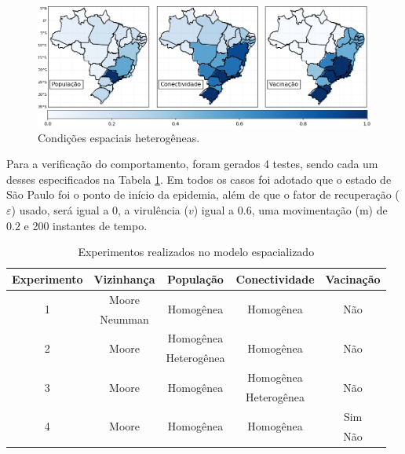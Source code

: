 \documentclass[a4paper,12pt]{article}
\begin{document}
\begin{figure}[!ht]
 \begin{center}
  \includegraphics[width=1\linewidth]{fig/variaveis_espaciais.png}
 \end{center}
 \caption{Condições espaciais heterogêneas.}
\label{figure:CI}
\end{figure}

Para a verificação do comportamento, foram gerados 4 testes, sendo cada um desses especificados na Tabela \ref{tab:exp}. Em todos os casos foi adotado que o estado de São Paulo foi o ponto de início da epidemia, além de que o fator de recuperação ($\varepsilon$) usado, será igual a 0, a virulência ($v$) igual a $0.6$, uma movimentação (m) de $0.2$ e 200 instantes de tempo.

\begin{table}[ht]
 \caption{Experimentos realizados no modelo espacializado}
 \centering
 \begin{tabular}{c|c|c|c|c}
  Experimento & Vizinhança & População & Conectividade & Vacinação \\
  \hline
  \multirow{2}{*}{1} & Moore & \multirow{2}{*}{Homogênea} & \multirow{2}{*}{Homogênea} & \multirow{2}{*}{Não} \\
   & Neumman &  &  &  \\
  \hline
  \multirow{2}{*}{2} & \multirow{2}{*}{Moore} & Homogênea & \multirow{2}{*}{Homogênea} & \multirow{2}{*}{Não} \\
  &  & Heterogênea &  &  \\
  \hline
  \multirow{2}{*}{3} & \multirow{2}{*}{Moore} & \multirow{2}{*}{Homogênea} & Homogênea & \multirow{2}{*}{Não} \\
  &  &  & Heterogênea &  \\
  \hline
  \multirow{2}{*}{4} & \multirow{2}{*}{Moore} & \multirow{2}{*}{Homogênea} & \multirow{2}{*}{Homogênea} & Sim \\
  &  &  &  & Não \\
\end{tabular}
\label{tab:exp}
\end{table}
\end{document}
